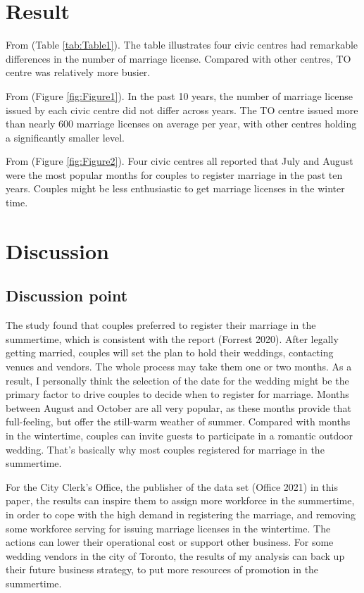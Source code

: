 \documentclass[
]{article}
\begin{document}
\hypertarget{result}{%
\section{Result}\label{result}}

From (Table \ref{tab:Table1}). The table illustrates four civic centres had remarkable differences in the number of marriage license. Compared with other centres, TO centre was relatively more busier.

From (Figure \ref{fig:Figure1}). In the past 10 years, the number of marriage license issued by each civic centre did not differ across years. The TO centre issued more than nearly 600 marriage licenses on average per year, with other centres holding a significantly smaller level.

From (Figure \ref{fig:Figure2}). Four civic centres all reported that July and August were the most popular months for couples to register marriage in the past ten years. Couples might be less enthusiastic to get marriage licenses in the winter time.

\hypertarget{discussion}{%
\section{Discussion}\label{discussion}}

\hypertarget{discussion-point}{%
\subsection{Discussion point}\label{discussion-point}}

The study found that couples preferred to register their marriage in the summertime, which is consistent with the report (Forrest 2020). After legally getting married, couples will set the plan to hold their weddings, contacting venues and vendors. The whole process may take them one or two months. As a result, I personally think the selection of the date for the wedding might be the primary factor to drive couples to decide when to register for marriage. Months between August and October are all very popular, as these months provide that full-feeling, but offer the still-warm weather of summer. Compared with months in the wintertime, couples can invite guests to participate in a romantic outdoor wedding. That's basically why most couples registered for marriage in the summertime.

For the City Clerk's Office, the publisher of the data set (Office 2021) in this paper, the results can inspire them to assign more workforce in the summertime, in order to cope with the high demand in registering the marriage, and removing some workforce serving for issuing marriage licenses in the wintertime. The actions can lower their operational cost or support other business. For some wedding vendors in the city of Toronto, the results of my analysis can back up their future business strategy, to put more resources of promotion in the summertime.
\end{document}
